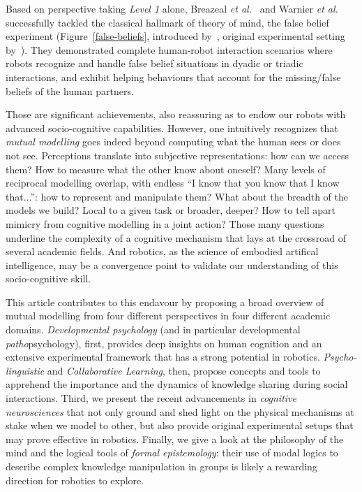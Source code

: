 \documentclass{sig-alternate}
\newcommand{\etal}{{\textit{et al.~}}}
\begin{document}
Based on perspective taking \emph{Level 1} alone, Breazeal
\etal\cite{breazeal2009embodied} and Warnier \etal\cite{warnier2012when}
successfully tackled the classical hallmark of theory of mind, the false belief
experiment (Figure~\ref{false-beliefs}, introduced by~\cite{wimmer1983beliefs},
original experimental setting by~\cite{baron1985does}). They demonstrated
complete human-robot interaction scenarios where robots recognize and handle
false belief situations in dyadic or triadic interactions, and exhibit helping
behaviours that account for the missing/false beliefs of the human partners.

Those are significant achievements, also reassuring as to endow our robots with
advanced socio-cognitive capabilities.  However, one intuitively recognizes that
\emph{mutual modelling} goes indeed beyond computing what the human sees or does
not see. Perceptions translate into subjective representations: how can we
access them? How to measure what the other know about oneself? Many levels of
reciprocal modelling overlap, with endless ``I know that you know that I know
that...'': how to represent and manipulate them? What about the breadth of the
models we build?  Local to a given task or broader, deeper? How to tell apart
mimicry from cognitive modelling in a joint action?  Those many questions
underline the complexity of a cognitive mechanism that lays at the crossroad of
several academic fields. And robotics, as the science of embodied artifical
intelligence, may be a convergence point to validate our understanding of this
socio-cognitive skill.

This article contributes to this endavour by proposing a broad overview of
mutual modelling from four different perspectives in four different academic
domains. \emph{Developmental psychology} (and in particular developmental
\emph{patho}psychology), first, provides deep insights on human cognition and an
extensive experimental framework that has a strong potential in robotics.
\emph{Psycho-linguistic} and \emph{Collaborative Learning}, then, propose
concepts and tools to apprehend the importance and the dynamics of knowledge
sharing during social interactions. Third, we present the recent advancements in
\emph{cognitive neurosciences} that not only ground and shed light on the
physical mechanisms at stake when we model to other, but also provide original
experimental setups that may prove effective in robotics. Finally, we give a
look at the philosophy of the mind and the logical tools of \emph{formal
epistemology}: their use of modal logics to describe complex knowledge
manipulation in groups is likely a rewarding direction for robotics to explore.
\end{document}

